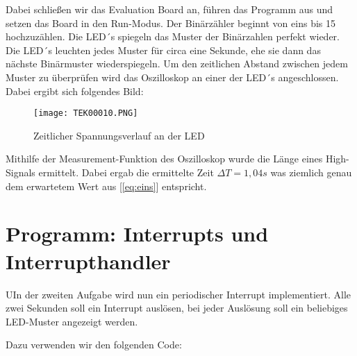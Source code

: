 \documentclass{article}
\begin{document}
Dabei schließen wir das Evaluation Board an, führen das Programm aus und setzen das Board in den Run-Modus. Der Binärzähler beginnt von eins bis 15 hochzuzählen. Die LED´s spiegeln das Muster der Binärzahlen perfekt wieder. Die LED´s leuchten jedes Muster für circa eine Sekunde, ehe sie dann das nächste Binärmuster wiederspiegeln. Um den zeitlichen Abstand zwischen jedem Muster zu überprüfen wird das Oszilloskop an einer der LED´s angeschlossen. Dabei ergibt sich folgendes Bild: 

\begin{figure}[h]
    \centering
    \texttt{[image: TEK00010.PNG]}
    \caption{Zeitlicher Spannungsverlauf an der LED}
\end{figure}

Mithilfe der Measurement-Funktion des Oszilloskop wurde die Länge eines High-Signals ermittelt. Dabei ergab die ermittelte Zeit $\Delta T = 1,04s$ was ziemlich genau dem erwartetem Wert aus [\ref{eq:eins}] entspricht.

\newpage

\section{Programm: Interrupts und Interrupthandler}


\begin{task}
  UIn der zweiten Aufgabe wird nun ein periodischer Interrupt implementiert. Alle zwei Sekunden soll ein Interrupt auslösen, bei jeder Auslösung soll ein beliebiges LED-Muster angezeigt werden.
\end{task}

Dazu verwenden wir den folgenden Code:
\end{document}
